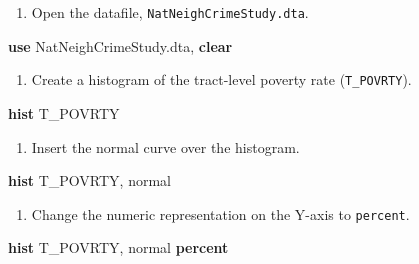 \documentclass[
]{book}
\newenvironment{Shaded}{\begin{snugshade}}{\end{snugshade}}
\newcommand{\FunctionTok}[1]{\textcolor[rgb]{0.00,0.00,0.00}{#1}}
\newcommand{\KeywordTok}[1]{\textcolor[rgb]{0.13,0.29,0.53}{\textbf{#1}}}
\newcommand{\NormalTok}[1]{#1}
\providecommand{\tightlist}{%
  \setlength{\itemsep}{0pt}\setlength{\parskip}{0pt}}
\begin{document}
\begin{alert}

\begin{enumerate}
\def\labelenumi{\arabic{enumi}.}
\tightlist
\item
  Open the datafile, \texttt{NatNeighCrimeStudy.dta}.
\end{enumerate}

\begin{Shaded}
\begin{Highlighting}[]
\KeywordTok{use}\NormalTok{ NatNeighCrimeStudy.dta, }\KeywordTok{clear}
\end{Highlighting}
\end{Shaded}

\begin{enumerate}
\def\labelenumi{\arabic{enumi}.}
\setcounter{enumi}{1}
\tightlist
\item
  Create a histogram of the tract-level poverty rate (\texttt{T\_POVRTY}).
\end{enumerate}

\begin{Shaded}
\begin{Highlighting}[]
\KeywordTok{hist}\NormalTok{ T\_POVRTY}
\end{Highlighting}
\end{Shaded}

\begin{enumerate}
\def\labelenumi{\arabic{enumi}.}
\setcounter{enumi}{2}
\tightlist
\item
  Insert the normal curve over the histogram.
\end{enumerate}

\begin{Shaded}
\begin{Highlighting}[]
\KeywordTok{hist}\NormalTok{ T\_POVRTY, }\FunctionTok{normal}
\end{Highlighting}
\end{Shaded}

\begin{enumerate}
\def\labelenumi{\arabic{enumi}.}
\setcounter{enumi}{3}
\tightlist
\item
  Change the numeric representation on the Y-axis to \texttt{percent}.
\end{enumerate}

\begin{Shaded}
\begin{Highlighting}[]
\KeywordTok{hist}\NormalTok{ T\_POVRTY, }\FunctionTok{normal} \KeywordTok{percent}
\end{Highlighting}
\end{Shaded}


\end{alert}
\end{document}
